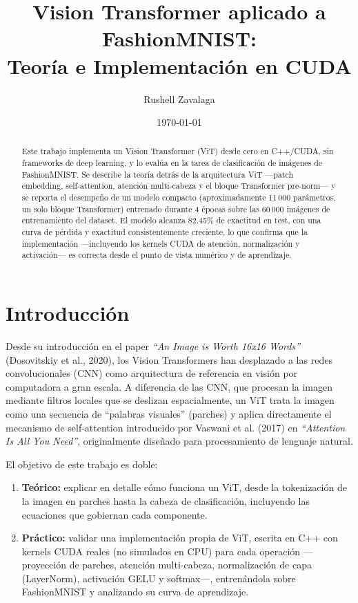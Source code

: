 \documentclass[11pt,a4paper]{article}
\title{Vision Transformer aplicado a FashionMNIST:\\ Teoría e Implementación en CUDA}
\author{Rushell Zavalaga}
\date{\today}
\begin{document}
\maketitle

\begin{abstract}
Este trabajo implementa un Vision Transformer (ViT) desde cero en C++/CUDA,
sin frameworks de deep learning, y lo evalúa en la tarea de clasificación de
imágenes de FashionMNIST. Se describe la teoría detrás de la arquitectura
ViT ---patch embedding, self-attention, atención multi-cabeza y el bloque
Transformer pre-norm--- y se reporta el desempeño de un modelo compacto
(aproximadamente 11\,000 parámetros, un solo bloque Transformer) entrenado
durante 4 épocas sobre las 60\,000 imágenes de entrenamiento del dataset. El
modelo alcanza 82.45\% de exactitud en test, con una curva de pérdida y
exactitud consistentemente creciente, lo que confirma que la implementación
---incluyendo los kernels CUDA de atención, normalización y activación--- es
correcta desde el punto de vista numérico y de aprendizaje.
\end{abstract}

\section{Introducción}

Desde su introducción en el paper \emph{``An Image is Worth 16x16 Words''}
(Dosovitskiy et al., 2020), los Vision Transformers han desplazado a las
redes convolucionales (CNN) como arquitectura de referencia en visión por
computadora a gran escala. A diferencia de las CNN, que procesan la imagen
mediante filtros locales que se deslizan espacialmente, un ViT trata la
imagen como una secuencia de ``palabras visuales'' (parches) y aplica
directamente el mecanismo de self-attention introducido por Vaswani et al.
(2017) en \emph{``Attention Is All You Need''}, originalmente diseñado para
procesamiento de lenguaje natural.

El objetivo de este trabajo es doble:

\begin{enumerate}
  \item \textbf{Teórico:} explicar en detalle cómo funciona un ViT, desde la
  tokenización de la imagen en parches hasta la cabeza de clasificación,
  incluyendo las ecuaciones que gobiernan cada componente.
  \item \textbf{Práctico:} validar una implementación propia de ViT, escrita
  en C++ con kernels CUDA reales (no simulados en CPU) para cada operación
  ---proyección de parches, atención multi-cabeza, normalización de capa
  (LayerNorm), activación GELU y softmax---, entrenándola sobre FashionMNIST
  y analizando su curva de aprendizaje.
\end{enumerate}
\end{document}
